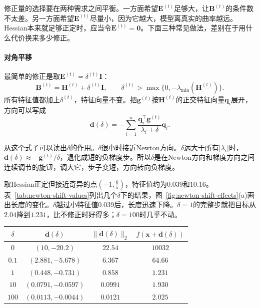 修正量的选择要在两种需求之间平衡。一方面希望$\bm{E}^{(t)}$足够大，让$\bm{B}^{(t)}$的条件数不太差。另一方面希望$\bm{E}^{(t)}$尽量小，因为它越大，模型离真实的曲率越远。Hessian本来就足够正定时，应当令$\bm{E}^{(t)}=\bm{0}$。下面三种常见做法，差别在于用什么代价换来多少修正。

\paragraph{对角平移}
最简单的修正是取$\bm{E}^{(t)}=\delta^{(t)}\bm{I}$：
\begin{equation}
 \bm{B}^{(t)}=\bm{H}^{(t)}+\delta^{(t)}\bm{I},\qquad \delta^{(t)}>\max\bigl\{0,-\lambda_{\min}(\bm{H}^{(t)})\bigr\}.
 \label{eq:newton-shift}
\end{equation}
所有特征值都加上$\delta^{(t)}$，特征向量不变。把$\bm{g}^{(t)}$按$\bm{H}^{(t)}$的正交特征向量$\bm{q}_i$展开，方向可以写成
\[
 \bm{d}(\delta)=-\sum_{i=1}^n\frac{\bm{q}_i^\top\bm{g}^{(t)}}{\lambda_i+\delta}\bm{q}_i.
\]

从这个式子可以读出$\delta$的作用。$\delta$很小时接近Newton方向。$\delta$远大于所有$\lvert\lambda_i\rvert$时，$\bm{d}(\delta)\approx-\bm{g}^{(t)}/\delta$，退化成短的负梯度步。所以$\delta$是在Newton方向和梯度方向之间连续调节的旋钮，调大它，步子变短，方向转向负梯度。

取Hessian正定但接近奇异的点$(-1,\tfrac65)$，特征值约为$0.039$和$10.16$。表~\ref{tab:newton-shift-values}列出几个$\delta$下的结果，图~\ref{fig:newton-shift-effects}(a)画出长度的变化。$\delta$越过小特征值$0.039$后，长度迅速下降。$\delta=1$的完整步就把目标从$2.04$降到$1.231$，比不修正时好得多；$\delta=100$时几乎不动。

\begin{BookInlineTable}
  \centering
  \begin{tabular}{@{}cccc@{}}
    \toprule
    $\delta$ & $\bm{d}(\delta)$ & $\lVert\bm{d}(\delta)\rVert_2$ & $f(\bm{x}+\bm{d}(\delta))$ \\
    \midrule
    $0$ & $(10,-20.2)$ & $22.54$ & $10032$ \\
    $0.1$ & $(2.881,-5.678)$ & $6.367$ & $64.66$ \\
    $1$ & $(0.448,-0.731)$ & $0.858$ & $1.231$ \\
    $10$ & $(0.0791,-0.0597)$ & $0.0991$ & $1.930$ \\
    $100$ & $(0.0113,-0.0044)$ & $0.0121$ & $2.025$ \\
    \bottomrule
  \end{tabular}
  \caption{在$\bm{x}=(-1,\tfrac65)$处对角平移的效果，出发点的目标值是$2.04$。修正太小方向过长，修正太大几乎原地不动。}
  \label{tab:newton-shift-values}
\end{BookInlineTable}

